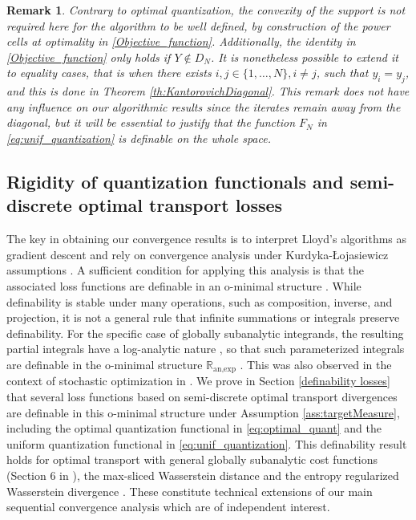 \documentclass[11pt]{article}
\newcommand{\1}{\mathbbm{1}}
\newtheorem{rem}[lem]{Remark}
\numberwithin{equation}{section}
\begin{document}
\begin{rem}
	Contrary to optimal quantization, the convexity of the support is not required here for the algorithm to be well defined, by construction of the power cells at optimality in \eqref{Objective_function}. Additionally, the identity in \eqref{Objective_function} only holds if $Y \not \in D_N$. It is nonetheless possible to extend it to equality cases, that is when there exists $i,j\in\{1,\ldots,N\}, i\neq j$, such that $y_i=y_j$, and this is done in Theorem \ref{th:KantorovichDiagonal}. 
	This remark does not have any influence on our algorithmic results since the iterates remain away from the diagonal, but it will be essential to justify that the function $F_N$ in \eqref{eq:unif_quantization} is definable on the whole space.
	\label{rem:unifQuantEverywhere}
\end{rem}




\subsection{Rigidity of quantization functionals and semi-discrete optimal transport losses}

The key in obtaining our convergence results is to interpret Lloyd's algorithms as gradient descent and rely on convergence analysis under Kurdyka-\L{ojasiewicz} assumptions \cite{AbsMahAnd2005,bolte2023subgradient}. A sufficient condition for applying this analysis is that the associated loss functions are definable in an o-minimal structure \cite{KurdykaarticleominimpliqueKL}.
While definability is stable under many operations, such as composition, inverse, and projection, it is not a general rule that infinite summations or integrals preserve definability. For the specific case of globally subanalytic integrands, the resulting partial integrals have a log-analytic nature \cite{lion1998integration,comte2000nature,Cluckers2009StabilityUI,kaiser2013integration}, so that such parameterized integrals are definable in the o-minimal structure  $\mathbb{R}_{\text{an,exp}}$ \cite{Dries1995OnTR}. This was also observed in the context of stochastic optimization in \cite{bolte2023subgradient}. We prove in Section  \ref{definability losses} that several loss functions based on semi-discrete optimal transport divergences are definable in this o-minimal structure under Assumption \ref{ass:targetMeasure}, including the optimal quantization functional in \eqref{eq:optimal_quant} and the uniform quantization functional in \eqref{eq:unif_quantization}. This definability result holds for optimal transport with general globally subanalytic cost functions (Section 6 in \cite{villanioptoldnew}), the max-sliced Wasserstein distance \cite{kolouri2019generalized} and the entropy regularized Wasserstein divergence \cite{Entropic}. These constitute technical extensions of our main sequential convergence analysis which are of independent interest.
\end{document}
